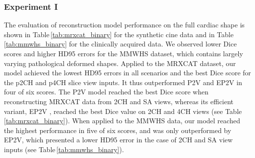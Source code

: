         \subsubsection{Experiment I}
            The evaluation of reconstruction model performance on the full cardiac shape is shown in Table\,\ref{tab:mrxcat_binary} for the synthetic cine data and in Table\,\ref{tab:mmwhs_binary} for the clinically acquired data. We observed lower Dice scores and higher HD95 errors for the MMWHS dataset, which contains largely varying pathological deformed shapes.
            Applied to the MRXCAT dataset, our model achieved the lowest HD95 errors in all scenarios and the best Dice score for the p2CH and p4CH slice view inputs. It thus outperformed P2V and EP2V in four of six scores.
            The P2V model \citep{xie2019pix2vox} reached the best Dice score when reconstructing MRXCAT data from 2CH and SA views, whereas its efficient variant, EP2V \citep{stojanovski2022efficient}, reached the best Dice value on 2CH and 4CH views (see Table\,\ref{tab:mrxcat_binary}).
            When applied to the MMWHS data, our model reached the highest performance in five of six scores,
            and was only outperformed by EP2V, which presented a lower HD95 error in the case of 2CH and SA view inputs (see Table\,\ref{tab:mmwhs_binary}).

